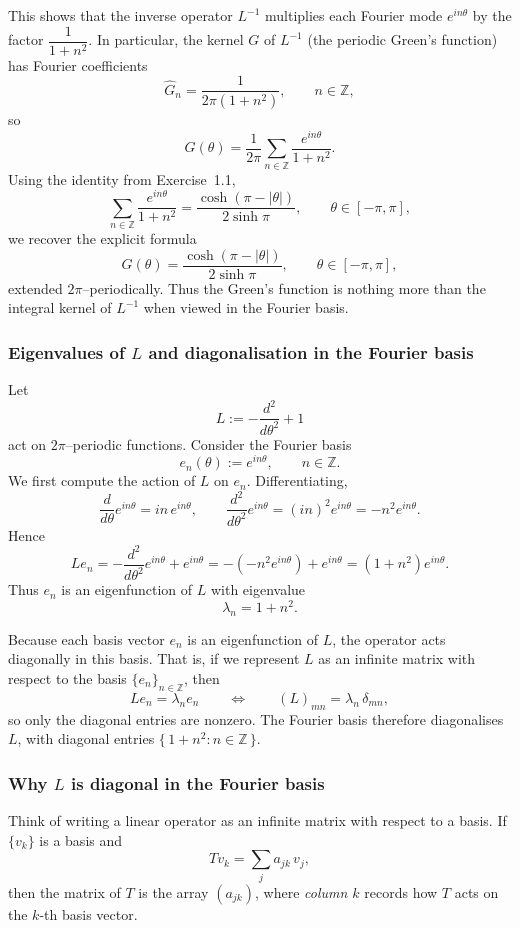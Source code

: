 \documentclass[12pt,a4paper]{article}
\theoremstyle{plain}
\theoremstyle{definition}
\theoremstyle{remark}
\theoremstyle{remark}
\begin{document}
\medskip

This shows that the inverse operator $L^{-1}$ multiplies each Fourier mode
$e^{in\theta}$ by the factor $\dfrac{1}{1+n^2}$.  In particular, the kernel
$G$ of $L^{-1}$ (the periodic Green's function) has Fourier coefficients
\[
\widehat{G}_n = \frac{1}{2\pi(1+n^2)},\qquad n\in\mathbb{Z},
\]
so
\[
G(\theta)
= \frac{1}{2\pi}\sum_{n\in\mathbb{Z}} \frac{e^{in\theta}}{1+n^2}.
\]
Using the identity from Exercise~1.1,
\[
\sum_{n\in\mathbb{Z}} \frac{e^{in\theta}}{1+n^2}
= \frac{\cosh(\pi-|\theta|)}{2\sinh\pi}, \qquad \theta\in[-\pi,\pi],
\]
we recover the explicit formula
\[
G(\theta)
= \frac{\cosh(\pi-|\theta|)}{2\sinh\pi},\qquad \theta\in[-\pi,\pi],
\]
extended $2\pi$--periodically.  Thus the Green's function is nothing more
than the integral kernel of $L^{-1}$ when viewed in the Fourier basis.

\subsubsection*{Eigenvalues of $L$ and diagonalisation in the Fourier basis}

Let
\[
L := -\frac{d^2}{d\theta^2} + 1
\]
act on $2\pi$--periodic functions.  Consider the Fourier basis
\[
e_n(\theta) := e^{in\theta},\qquad n\in\mathbb{Z}.
\]
We first compute the action of $L$ on $e_n$.  Differentiating,
\[
\frac{d}{d\theta}e^{in\theta} = in\,e^{in\theta},\qquad
\frac{d^2}{d\theta^2}e^{in\theta} = (in)^2 e^{in\theta}
= -n^2 e^{in\theta}.
\]
Hence
\[
L e_n
= -\frac{d^2}{d\theta^2}e^{in\theta} + e^{in\theta}
= -(-n^2 e^{in\theta}) + e^{in\theta}
= (1+n^2)e^{in\theta}.
\]
Thus $e_n$ is an eigenfunction of $L$ with eigenvalue
\[
\lambda_n = 1+n^2.
\]

Because each basis vector $e_n$ is an eigenfunction of $L$, the operator
acts diagonally in this basis.  That is, if we represent $L$ as an infinite
matrix with respect to the basis $\{e_n\}_{n\in\mathbb{Z}}$, then
\[
L e_n = \lambda_n e_n \qquad\Longleftrightarrow\qquad
(L)_{mn} = \lambda_n\,\delta_{mn},
\]
so only the diagonal entries are nonzero.  The Fourier basis therefore
diagonalises $L$, with diagonal entries $\{\,1+n^2 : n\in\mathbb{Z}\,\}$.

\subsubsection*{Why $L$ is diagonal in the Fourier basis}

Think of writing a linear operator as an infinite matrix with respect to a
basis.  If $\{v_k\}$ is a basis and
\[
Tv_k = \sum_j a_{jk}\,v_j,
\]
then the matrix of $T$ is the array $(a_{jk})$, where \emph{column $k$}
records how $T$ acts on the $k$-th basis vector.
\end{document}
